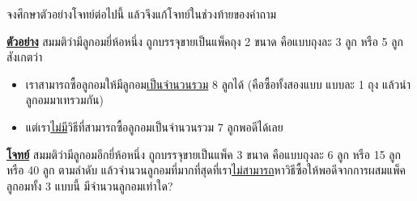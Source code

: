 \question{}

จงศึกษาตัวอย่างโจทย์ต่อไปนี้ แล้วจึงแก้โจทย์ในช่วงท้ายของคำถาม

\smallskip\noindent
\textbf{\uline{ตัวอย่าง}}\; สมมติว่ามีลูกอมยี่ห้อหนึ่ง ถูกบรรจุขายเป็นแพ็คถุง 2 ขนาด คือแบบถุงละ 3 ลูก หรือ 5 ลูก สังเกตว่า

\begin{itemize}[before*=\small]
\item เราสามารถซื้อลูกอมให้มีลูกอม\uline{เป็นจำนวนรวม} 8 ลูกได้ 
    (คือซื้อทั้งสองแบบ แบบละ 1 ถุง แล้วนำลูกอมมาเทรวมกัน)
\item แต่เรา\uline{ไม่มี}วิธีที่สามารถซื้อลูกอมเป็นจำนวนรวม 7 ลูกพอดีได้เลย
\end{itemize}

\noindent
\textbf{\uline{โจทย์}}\; สมมติว่ามีลูกอมอีกยี่ห้อหนึ่ง ถูกบรรจุขายเป็นแพ็ค 3 ขนาด 
คือแบบถุงละ 6 ลูก หรือ 15 ลูก หรือ 40 ลูก ตามลำดับ\;
แล้วจำนวนลูกอมที่มากที่สุดที่เรา\uline{ไม่สามารถ}หาวิธีซื้อให้พอดีจากการผสมแพ็คลูกอมทั้ง 3 แบบนี้ มีจำนวนลูกอมเท่าใด?
